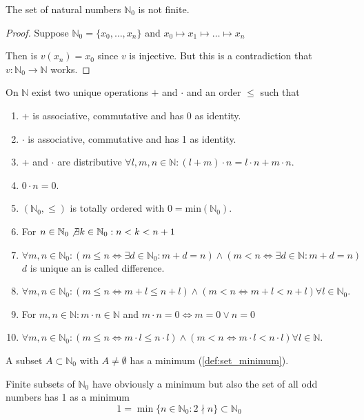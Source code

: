 \begin{proposition}
   The set of natural numbers \(\mathbb{N}_0\) is not finite.
\end{proposition}
\begin{proof}
   Suppose \(\mathbb{N}_0 = \{x_0, \ldots, x_n\}\) and \(x_0 \mapsto x_1 \mapsto \ldots \mapsto x_n\)

   Then is \(v(x_n) = x_0\) since \(v\) is injective.
   But this is a contradiction that \(v: \mathbb{N}_0 \to \mathbb{N}\) works.
\end{proof}

\begin{theorem}[Peano]\label{thm:peano}
   On \(\mathbb{N}\) exist two unique operations \(+\) and \(\cdot\) and an order \(\leq\) such that
   \begin{enumerate}
      \item + is associative, commutative and has 0 as identity.
      \item \(\cdot\) is associative, commutative and has 1 as identity.
      \item + and \(\cdot\) are distributive \(\forall l, m, n \in \mathbb{N}: (l + m) \cdot n = l \cdot n + m \cdot n\).
      \item \(0 \cdot n = 0\).
      \item \((\mathbb{N}_0, \leq)\) is totally ordered with \(0 = \text{min}(\mathbb{N}_0)\).
      \item For \(n \in \mathbb{N}_0 \not\exists k \in \mathbb{N}_0: n < k < n + 1\)
      \item \(\forall m, n \in \mathbb{N}_0: (m \leq n \iff \exists d \in \mathbb{N}_0: m + d = n) \land (m < n \iff \exists d \in \mathbb{N}: m + d = n)\)\\
         \(d\) is unique an is called difference.
      \item \(\forall m, n \in \mathbb{N}_0: (m \leq n \iff m + l \leq n + l) \land (m < n \iff m + l < n + l) \forall l \in \mathbb{N}_0\).
      \item For \(m, n \in \mathbb{N}: m \cdot n \in \mathbb{N}\) and \(m \cdot n = 0 \iff m = 0 \lor n = 0\)
         \item \(\forall m, n \in \mathbb{N}_0: (m \leq n \iff m \cdot l \leq n \cdot l) \land (m < n \iff m \cdot l < n \cdot l) \forall l \in \mathbb{N}\).
   \end{enumerate}
\end{theorem}

\begin{proposition}\label{pro:wellorder_N}
   A subset \(A \subset \mathbb{N}_0\) with \(A \neq \emptyset\) has a minimum (\ref{def:set_minimum}).
\end{proposition}
\begin{example}
   Finite subsets of \(\mathbb{N}_0\) have obviously a minimum but also the set of all odd numbers has 1 as a minimum
   \[1 = \min\{n \in \mathbb{N}_0: 2 \nmid n\} \subset \mathbb{N}_0\]
\end{example}

